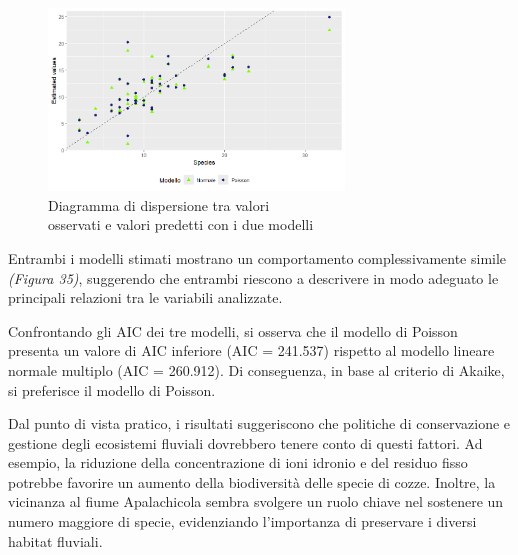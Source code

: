 \documentclass{article} %
\begin{document}
\begin{figure}[H]
    \centering
    \includegraphics[width=0.7\textwidth]{immagini/lm_glm.png}
    \captionsetup{justification=centering}
    \caption{Diagramma di dispersione tra valori \\osservati e valori predetti con i due modelli}
\end{figure}

Entrambi i modelli stimati mostrano un comportamento complessivamente simile \textit{(Figura 35)}, suggerendo che entrambi riescono a descrivere in modo adeguato le principali relazioni tra le variabili analizzate.

Confrontando gli AIC dei tre modelli, si osserva che il modello di Poisson presenta un valore di AIC inferiore (AIC = 241.537) rispetto al modello lineare normale multiplo (AIC = 260.912). Di conseguenza, in base al criterio di Akaike, si preferisce il modello di Poisson.

Dal punto di vista pratico, i risultati suggeriscono che politiche di conservazione e gestione degli ecosistemi fluviali dovrebbero tenere conto di questi fattori. Ad esempio, la riduzione della concentrazione di ioni idronio e del residuo fisso potrebbe favorire un aumento della biodiversità delle specie di cozze. Inoltre, la vicinanza al fiume Apalachicola sembra svolgere un ruolo chiave nel sostenere un numero maggiore di specie, evidenziando l'importanza di preservare i diversi habitat fluviali.
\end{document}
